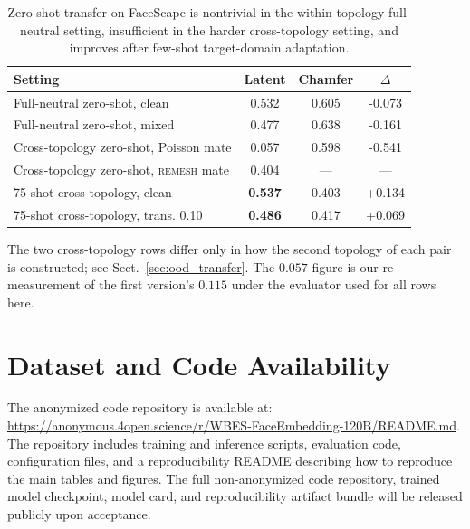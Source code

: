 \documentclass{article}
\begin{document}
\begin{table}[!ht]
\centering
\small
\caption{Zero-shot transfer on FaceScape is nontrivial in the within-topology full-neutral setting, insufficient in the harder cross-topology setting, and improves after few-shot target-domain adaptation.}
\label{tab:faceverse_summary}
\begin{tabular}{lccc}
\toprule
Setting & Latent & Chamfer & $\Delta$ \\
\midrule
Full-neutral zero-shot, clean & 0.532 & 0.605 & -0.073 \\
Full-neutral zero-shot, mixed & 0.477 & 0.638 & -0.161 \\
Cross-topology zero-shot, Poisson mate & 0.057 & 0.598 & -0.541 \\
Cross-topology zero-shot, \textsc{remesh} mate & 0.404 & --- & --- \\
75-shot cross-topology, clean & \textbf{0.537} & 0.403 & +0.134 \\
75-shot cross-topology, trans. 0.10 & \textbf{0.486} & 0.417 & +0.069 \\
\bottomrule
\end{tabular}

\vspace{0.3em}
\footnotesize{The two cross-topology rows differ only in how the second topology of each
pair is constructed; see Sect.~\ref{sec:ood_transfer}. The $0.057$ figure is our
re-measurement of the first version's $0.115$ under the evaluator used for all rows here.}
\end{table}


\section{Dataset and Code Availability}
\label{sec:availability}

The anonymized code repository is available at:
\url{https://anonymous.4open.science/r/WBES-FaceEmbedding-120B/README.md}.
The repository includes training and inference scripts, evaluation code,
configuration files, and a reproducibility README describing how to reproduce the
main tables and figures. The full non-anonymized code repository, trained model checkpoint, model card,
and reproducibility artifact bundle will be released publicly upon acceptance.
\end{document}
